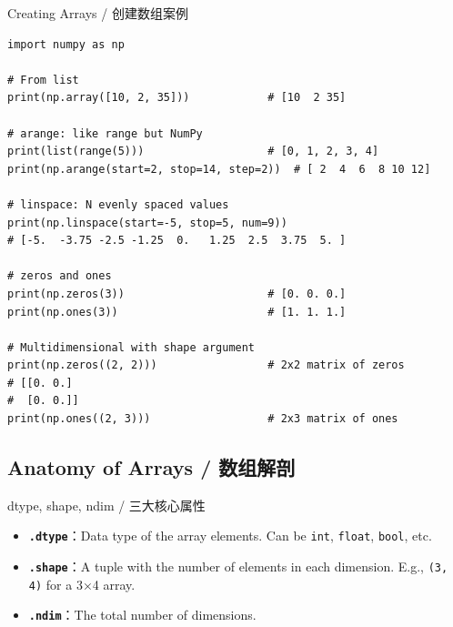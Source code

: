 \documentclass[11pt,a4paper]{report}
\let\oldtexttt\texttt
\renewcommand{\texttt}[1]{\textcolor{mainblue}{\oldtexttt{#1}}}
\begin{document}
\begin{examplebox}{Creating Arrays / 创建数组案例}
\begin{lstlisting}
import numpy as np

# From list
print(np.array([10, 2, 35]))            # [10  2 35]

# arange: like range but NumPy
print(list(range(5)))                   # [0, 1, 2, 3, 4]
print(np.arange(start=2, stop=14, step=2))  # [ 2  4  6  8 10 12]

# linspace: N evenly spaced values
print(np.linspace(start=-5, stop=5, num=9))
# [-5.  -3.75 -2.5 -1.25  0.   1.25  2.5  3.75  5. ]

# zeros and ones
print(np.zeros(3))                      # [0. 0. 0.]
print(np.ones(3))                       # [1. 1. 1.]

# Multidimensional with shape argument
print(np.zeros((2, 2)))                 # 2x2 matrix of zeros
# [[0. 0.]
#  [0. 0.]]
print(np.ones((2, 3)))                  # 2x3 matrix of ones
\end{lstlisting}
\end{examplebox}

\subsection{Anatomy of Arrays / 数组解剖}

\begin{concept}{dtype, shape, ndim / 三大核心属性}
    \begin{itemize}[itemsep=0.5em]
        \item \textbf{\texttt{.dtype}}：Data type of the array elements. Can be \texttt{int}, \texttt{float}, \texttt{bool}, etc.
        \item \textbf{\texttt{.shape}}：A tuple with the number of elements in each dimension. E.g., \texttt{(3, 4)} for a 3×4 array.
        \item \textbf{\texttt{.ndim}}：The total number of dimensions.
    \end{itemize}
\end{concept}
\end{document}
